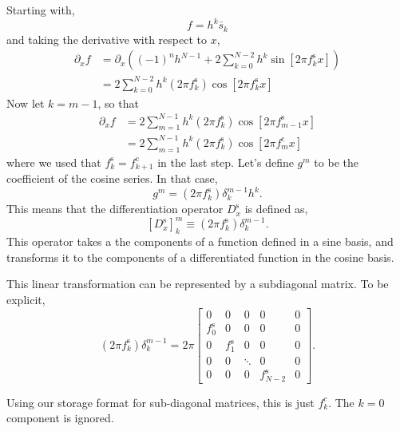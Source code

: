 \documentclass[11pt]{article}
\begin{document}
Starting with,
\begin{equation}
f = h^k \bar{s}_k
\end{equation}
and taking the derivative with respect to $x$,
\begin{align}
\partial_x f &= \partial_x  \left( (-1)^n h^{N-1} + 2 \sum_{k=0}^{N-2} h^k \sin \left[ 2 \pi f_k^{\textrm{s}} x \right] \right)\\
&= 2 \sum_{k=0}^{N-2} h^k \left( 2 \pi f_k^{\textrm{s}} \right) \cos \left[ 2 \pi f_k^{\textrm{s}} x \right]
\end{align}
Now let $k=m-1$, so that
\begin{align}
\partial_x f &= 2 \sum_{m=1}^{N-1}  h^k \left( 2 \pi f_k^{\textrm{s}} \right)\cos \left[ 2 \pi f_{m-1}^{\textrm{s}} x \right] \\
&= 2 \sum_{m=1}^{N-1}  h^k \left( 2 \pi f_k^{\textrm{s}} \right) \cos \left[ 2 \pi f_m^{\textrm{c}} x \right]
\end{align}
where we used that $f_k^{\textrm{s}}=f_{k+1}^{\textrm{c}}$ in the last step. Let's define $g^m$ to be the coefficient of the cosine series. In that case,
\begin{equation}
g^m = \left( 2 \pi f_k^{\textrm{s}} \right) \delta^{m-1}_k h^k .
\end{equation}
This means that the differentiation operator $D_x^{\textrm{s}}$ is defined as,
\begin{equation}
\left[D_x^{\textrm{s}}\right]^m_k \equiv \left( 2 \pi f_k^{\textrm{s}} \right) \delta^{m-1}_k.
\end{equation}
This operator takes a the components of a function defined in a sine basis, and transforms it to the components of a differentiated function in the cosine basis.

This linear transformation can be represented by a subdiagonal matrix. To be explicit,
\begin{equation}
\left( 2 \pi f_k^{\textrm{s}} \right) \delta^{m-1}_k = 2 \pi \left[\begin{array}{ccccc}0 & 0 & 0 & 0 & 0 \\f_0^{\textrm{s}} & 0 & 0 & 0 & 0 \\0 & f_1^{\textrm{s}} & 0 & 0 & 0 \\0 & 0 & \ddots & 0 & 0 \\0 & 0 & 0 & f_{N-2}^{\textrm{s}} & 0\end{array}\right].
\end{equation}

Using our storage format for sub-diagonal matrices, this is just $f^c_k$. The $k=0$ component is ignored.
\end{document}
